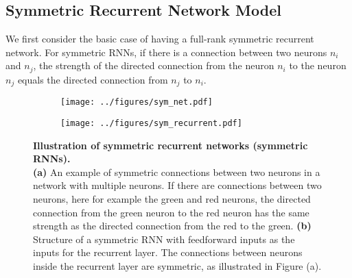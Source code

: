 \documentclass[11pt]{article}
\begin{document}
	\subsection{Symmetric Recurrent Network Model} \label{sec:ffrec_sym}
	We first consider the basic case of having a full-rank symmetric recurrent network. For symmetric RNNs, if there is a connection between two neurons $n_i$ and $n_j$, the strength of the directed connection from the neuron $n_i$ to the neuron $n_j$ equals the directed connection from $n_j$ to $n_i$. 
		\begin{figure}[H] 
			\begin{subfigure}[b]{0.4\textwidth}
				\centering
				\texttt{[image: ../figures/sym\_net.pdf]}
				\vspace{0.2cm}
				\caption{}
			\end{subfigure}
			\hspace{0.4cm}
			\begin{subfigure}[b]{0.4\textwidth}
				\centering
				\texttt{[image: ../figures/sym\_recurrent.pdf]}
				\caption{}
			\end{subfigure}
		\caption[Illustration of symmetric recurrent networks (symmetric RNNs)]{\textbf{Illustration of symmetric recurrent networks (symmetric RNNs).} \\ \textbf{(a)} An example of symmetric connections between two neurons in a network with multiple neurons. If there are connections between two neurons, here for example the green and red neurons, the directed connection from the green neuron to the red neuron has the same strength as the directed connection from the red to the green. \textbf{(b)} Structure of a symmetric RNN with feedforward inputs as the inputs for the recurrent layer. The connections between neurons inside the recurrent layer are symmetric, as illustrated in Figure (a).}
		\label{fig:symmetric_RNN}
		\end{figure}
	
\end{document}
